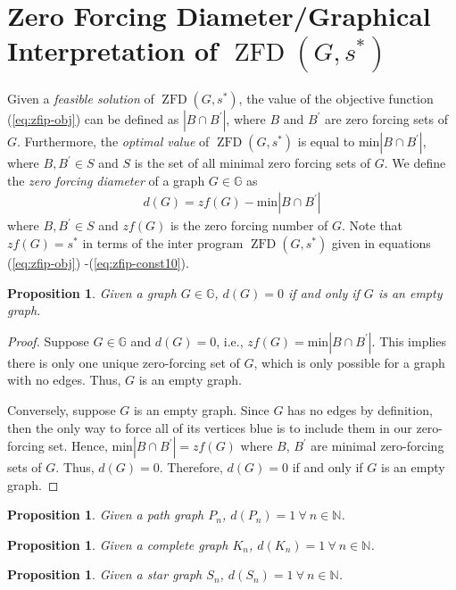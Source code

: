 \documentclass{article}
\newcommand\zfd[1]{\operatorname{ZFD}\left(#1\right)}
\newtheorem{proposition}[theorem]{Proposition}
\theoremstyle{definition}
\begin{document}
\section{Zero Forcing Diameter/Graphical Interpretation of $\zfd{G,s^{*}}$}\label{sec:zfdiam}
 Given a \textit{feasible solution} of $\zfd{G,s^{*}}$, the value of the objective function (\ref{eq:zfip-obj}) can be defined as $|B \cap B^{'}|$, where $B$ and $B^{'}$ are zero forcing sets of $G$.
Furthermore, the \textit{optimal value} of $\zfd{G,s^{*}}$ is equal to $\text{min}|B \cap B^{'}|$, where $B,B^{'} \in S$ and $S$ is the set of all minimal zero forcing sets of $G$.
We define the \textit{zero forcing diameter} of a graph $G \in \mathbb{G}$ as 
\begin{align}
d(G) = zf(G) - \text{min}|B \cap B^{'}|
\end{align}
 where $B,B^{'} \in S$ and $zf(G)$ is the zero forcing number of $G$.
Note that $zf(G) = s^{*}$ in terms of the inter program $\zfd{G,s^{*}}$ given in equations (\ref{eq:zfip-obj}) -(\ref{eq:zfip-const10}).

\begin{proposition}
Given a graph $G \in \mathbb{G}$, $d(G) = 0$ if and only if $G$ is an empty graph.
\end{proposition}
\begin{proof}
Suppose $G \in \mathbb{G}$ and $d(G) = 0$, i.e., $zf(G) = \text{min}|B \cap B^{'}|$.
This implies there is only one unique zero-forcing set of $G$, which is only possible for a graph with no edges.
Thus, $G$ is an empty graph.

Conversely, suppose $G$ is an empty graph.
Since $G$ has no edges by definition, then the only way to force all of its vertices blue is to include them in our zero-forcing set.
Hence, $\text{min}|B \cap B^{'}| = zf(G)$ where $B$, $B^{'}$ are minimal zero-forcing sets of $G$.
Thus, $d(G) = 0$.
Therefore, $d(G) = 0$ if and only if $G$ is an empty graph.

\end{proof}

\begin{proposition}
Given a path graph $P_n$, $d(P_n)=1 \ \forall \ n \in \mathbb{N}$.
\end{proposition}

\begin{proposition}
Given a complete graph $K_n$, $d(K_n)=1 \ \forall \ n \in \mathbb{N}$.
\end{proposition}

\begin{proposition}
Given a star graph $S_n$, $d(S_n)=1 \ \forall \ n \in \mathbb{N}$.
\end{proposition}
\end{document}
